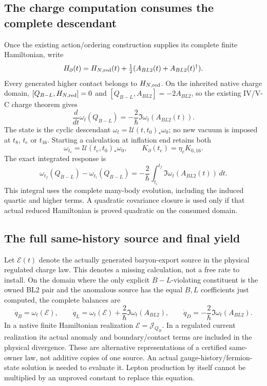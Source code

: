 \documentclass[12pt,a4paper]{article}
\begin{document}
\subsection{The charge computation consumes the complete descendant}
Once the existing action/ordering construction supplies its complete finite
Hamiltonian, write
\[
 H_\partial(t)=H_{N,\rm red}(t)+\tfrac12(A_{BL2}(t)+A_{BL2}(t)^\dagger).
\]
Every generated higher contact belongs to $H_{N,\rm red}$.
On the inherited native charge domain, $[Q_{B-L},H_{N,\rm red}]=0$ and
$[Q_{B-L},A_{BL2}]=-2A_{BL2}$, so the existing IV/V-C charge theorem gives
\begin{equation}
 \frac{d}{dt}\omega_t(Q_{B-L})
 =-\frac2\hbar\Im\omega_t(A_{BL2}(t)).
 \label{p9:v2171:eq:ward}
\end{equation}
The state is the cyclic descendant $\omega_t=\mathcal U(t,t_0)_*\omega_0$;
no new vacuum is imposed at $t_8$, $t_e$ or $t_{16}$. Starting a calculation
at inflation end retains both
\[
 \omega_{t_e}=\mathcal U(t_e,t_0)_*\omega_0,
 \qquad K_\partial(t_e)=\eta_eK_{0,16}.
\]
The exact integrated response is
\begin{equation}
 \omega_{t_f}(Q_{B-L})-\omega_{t_i}(Q_{B-L})
 =-\frac2\hbar\int_{t_i}^{t_f}\Im\omega_t(A_{BL2}(t))\,dt.
 \label{p9:v2171:eq:chargeintegral}
\end{equation}
This integral uses the complete many-body evolution, including the induced
quartic and higher terms. A quadratic covariance closure is used only if
that actual reduced Hamiltonian is proved quadratic on the consumed domain.

\subsection{The full same-history source and final yield}
\label{p9:v2171:sec:finalyield}
Let $\mathcal E(t)$ denote the actually generated baryon-export source in
the physical regulated charge law. This denotes a missing calculation,
not a free rate to install. On the domain where the only explicit
$B-L$-violating constituent is the owned BL2 pair and the anomalous source
has the equal $B,L$ coefficients just computed, the complete balances are
\begin{equation}
 \dot q_B=\omega_t(\mathcal E),\qquad
 \dot q_L=\omega_t(\mathcal E)+\frac2\hbar\Im\omega_t(A_{BL2}),\qquad
 \dot q_D=-\frac2\hbar\Im\omega_t(A_{BL2}).
 \label{p9:v2171:eq:coupledbalances}
\end{equation}
In a native finite Hamiltonian realization $\mathcal E=\mathcal J_{Q_B}$.
In a regulated current realization its actual anomaly and boundary/contact
terms are included in the physical divergence. These are alternative
representations of a certified same-owner law, not additive copies of one
source. An actual gauge-history/fermion-state solution is needed to
evaluate it. Lepton production by itself cannot be multiplied by an
unproved constant to replace this equation.
\end{document}

